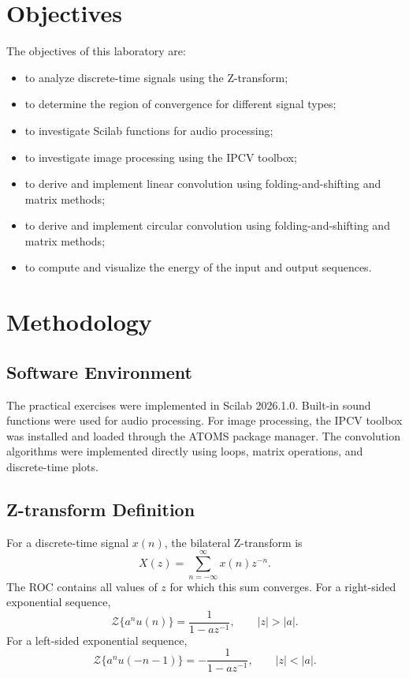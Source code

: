 \documentclass[12pt,a4paper]{article}
\begin{document}
\section{Objectives}
The objectives of this laboratory are:
\begin{itemize}[leftmargin=1.5em]
    \item to analyze discrete-time signals using the Z-transform;
    \item to determine the region of convergence for different signal types;
    \item to investigate Scilab functions for audio processing;
    \item to investigate image processing using the IPCV toolbox;
    \item to derive and implement linear convolution using folding-and-shifting and matrix methods;
    \item to derive and implement circular convolution using folding-and-shifting and matrix methods;
    \item to compute and visualize the energy of the input and output sequences.
\end{itemize}

\section{Methodology}

\subsection{Software Environment}
The practical exercises were implemented in Scilab 2026.1.0. Built-in
sound functions were used for audio processing. For image processing,
the IPCV toolbox was installed and loaded through the ATOMS package
manager. The convolution algorithms were implemented directly using
loops, matrix operations, and discrete-time plots.

\subsection{Z-transform Definition}
For a discrete-time signal $x(n)$, the bilateral Z-transform is
\[
X(z)=\sum_{n=-\infty}^{\infty} x(n)z^{-n}.
\]
The ROC contains all values of $z$ for which this sum converges.
For a right-sided exponential sequence,
\[
\mathcal{Z}\{a^n u(n)\}=\frac{1}{1-a z^{-1}},
\qquad |z|>|a|.
\]
For a left-sided exponential sequence,
\[
\mathcal{Z}\{a^n u(-n-1)\}=-\frac{1}{1-a z^{-1}},
\qquad |z|<|a|.
\]
\end{document}
